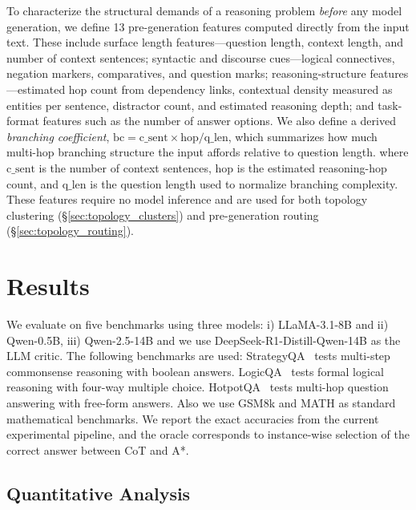 \documentclass[11pt]{article}
\begin{document}
To characterize the structural demands of a reasoning problem \emph{before} any model generation, we define 13 pre-generation features computed directly from the input text. These include surface length features---question length, context length, and number of context sentences; syntactic and discourse cues---logical connectives, negation markers, comparatives, and question marks; reasoning-structure features---estimated hop count from dependency links, contextual density measured as entities per sentence, distractor count, and estimated reasoning depth; and task-format features such as the number of answer options. We also define a derived \emph{branching coefficient}, $\mathrm{bc}=\mathrm{c\_sent}\times \mathrm{hop}/\mathrm{q\_len}$, which summarizes how much multi-hop branching structure the input affords relative to question length. 
where $\mathrm{c\_sent}$ is the number of context sentences, $\mathrm{hop}$ is the estimated reasoning-hop count, and $\mathrm{q\_len}$ is the question length used to normalize branching complexity.
These features require no model inference and are used for both topology clustering (\S\ref{sec:topology_clusters}) and pre-generation routing (\S\ref{sec:topology_routing}).




\section{Results}
\label{sec:results}

We evaluate on five benchmarks using three models: i) LLaMA-3.1-8B and ii) Qwen-0.5B, iii) Qwen-2.5-14B and we use DeepSeek-R1-Distill-Qwen-14B as the LLM critic. The following benchmarks are used: StrategyQA~\cite{geva2021did} tests multi-step commonsense reasoning with boolean answers. LogicQA~\cite{liu2020logiqa} tests formal logical reasoning with four-way multiple choice. HotpotQA~\cite{yang2018hotpotqa} tests multi-hop question answering with free-form answers. Also we use GSM8k and MATH as standard mathematical benchmarks. We report the exact accuracies from the current experimental pipeline, and the oracle corresponds to instance-wise selection of the correct answer between CoT and A*.

\subsection{Quantitative Analysis}
\label{sec:quantitative}
\end{document}
